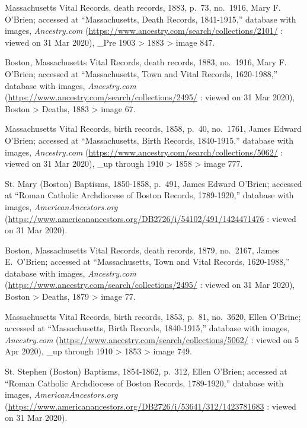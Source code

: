 \begin{thebibliography}{999}
	Massachusetts Vital Records, death records, 1883, p.\ 73, no.\ 1916, Mary F. O'Brien; accessed at ``Massachusetts, Death Records, 1841-1915,'' database with images, \textit{Ancestry.com} (\url{https://www.ancestry.com/search/collections/2101/} : viewed on 31 Mar 2020), \_Pre 1903 > 1883 > image 847.
	
	Boston, Massachusetts Vital Records, death records, 1883, no.\ 1916, Mary F. O'Brien; accessed at ``Massachusetts, Town and Vital Records, 1620-1988,'' database with images, \textit{Ancestry.com} (\url{https://www.ancestry.com/search/collections/2495/} : viewed on 31 Mar 2020), Boston > Deaths, 1883 > image 67.
	
	Massachusetts Vital Records, birth records, 1858, p.\ 40, no.\ 1761, James Edward O'Brien; accessed at ``Massachusetts, Birth Records, 1840-1915,'' database with images, \textit{Ancestry.com} (\url{https://www.ancestry.com/search/collections/5062/} : viewed on 31 Mar 2020), \_up through 1910 > 1858 > image 777.
	
	St. Mary (Boston) Baptisms, 1850-1858, p.\ 491, James Edward O'Brien; accessed at ``Roman Catholic Archdiocese of Boston Records, 1789-1920,'' database with images, \textit{AmericanAncestors.org} (\url{https://www.americanancestors.org/DB2726/i/54102/491/1424471476} : viewed on 31 Mar 2020).
	
	Boston, Massachusetts Vital Records, death records, 1879, no.\ 2167, James E.\ O'Brien; accessed at ``Massachusetts, Town and Vital Records, 1620-1988,'' database with images, \textit{Ancestry.com} (\url{https://www.ancestry.com/search/collections/2495/} : viewed on 31 Mar 2020), Boston > Deaths, 1879 > image 77.
	
	Massachusetts Vital Records, birth records, 1853, p.\ 81, no.\ 3620, Ellen O'Brine; accessed at ``Massachusetts, Birth Records, 1840-1915,'' database with images, \textit{Ancestry.com} (\url{https://www.ancestry.com/search/collections/5062/} : viewed on 5 Apr 2020), \_up through 1910 > 1853 > image 749.
	
	St. Stephen (Boston) Baptisms, 1854-1862, p.\ 312, Ellen O'Brien; accessed at ``Roman Catholic Archdiocese of Boston Records, 1789-1920,'' database with images, \textit{AmericanAncestors.org} (\url{https://www.americanancestors.org/DB2726/i/53641/312/1423781683} : viewed on 31 Mar 2020).
	

\end{thebibliography}
